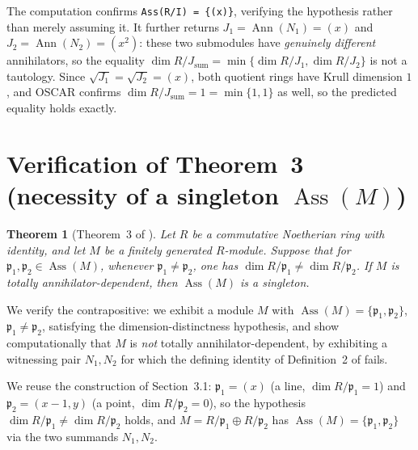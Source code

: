 \documentclass[11pt]{article}
\newtheorem{theorem}{Theorem}
\newcommand{\Ass}{\operatorname{Ass}}
\begin{document}
The computation confirms \texttt{Ass(R/I) = \{(x)\}}, verifying the
hypothesis rather than merely assuming it. It further returns
$J_1=\operatorname{Ann}(N_1)=(x)$ and
$J_2=\operatorname{Ann}(N_2)=(x^2)$: these two submodules have
\emph{genuinely different} annihilators, so the equality
$\dim R/J_{\mathrm{sum}}=\min\{\dim R/J_1,\dim R/J_2\}$ is not a
tautology. Since $\sqrt{J_1}=\sqrt{J_2}=(x)$, both quotient rings have
Krull dimension $1$, and OSCAR confirms $\dim R/J_{\mathrm{sum}}=1=\min\{1,1\}$
as well, so the predicted equality holds exactly.

\section{Verification of Theorem~3 (necessity of a singleton $\Ass(M)$)}

\begin{theorem}[Theorem~3 of \cite{pekin-ozkaya-2026}]
\label{thm:3}
Let $R$ be a commutative Noetherian ring with identity, and let $M$ be a
finitely generated $R$-module. Suppose that for $\mathfrak p_1,\mathfrak
p_2\in\Ass(M)$, whenever $\mathfrak p_1\neq\mathfrak p_2$, one has
$\dim R/\mathfrak p_1 \neq \dim R/\mathfrak p_2$. If $M$ is totally
annihilator-dependent, then $\Ass(M)$ is a singleton.
\end{theorem}

We verify the contrapositive: we exhibit a module $M$ with
$\Ass(M)=\{\mathfrak p_1,\mathfrak p_2\}$, $\mathfrak p_1\neq \mathfrak
p_2$, satisfying the dimension-distinctness hypothesis, and show
computationally that $M$ is \emph{not} totally annihilator-dependent, by
exhibiting a witnessing pair $N_1,N_2$ for which the defining identity of
Definition~2 of \cite{pekin-ozkaya-2026} fails.

We reuse the construction of Section~3.1: $\mathfrak p_1=(x)$ (a line,
$\dim R/\mathfrak p_1=1$) and $\mathfrak p_2=(x-1,y)$ (a point, $\dim
R/\mathfrak p_2=0$), so the hypothesis $\dim R/\mathfrak p_1\neq\dim
R/\mathfrak p_2$ holds, and $M=R/\mathfrak p_1\oplus R/\mathfrak p_2$ has
$\Ass(M)=\{\mathfrak p_1,\mathfrak p_2\}$ via the two summands $N_1,N_2$.
\end{document}
